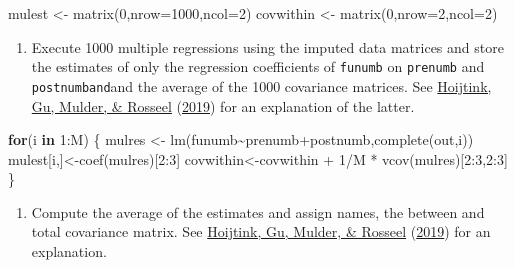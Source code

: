 \documentclass[
]{book}
\newenvironment{Shaded}{\begin{snugshade}}{\end{snugshade}}
\newcommand{\AttributeTok}[1]{\textcolor[rgb]{0.77,0.63,0.00}{#1}}
\newcommand{\ControlFlowTok}[1]{\textcolor[rgb]{0.13,0.29,0.53}{\textbf{#1}}}
\newcommand{\DecValTok}[1]{\textcolor[rgb]{0.00,0.00,0.81}{#1}}
\newcommand{\FunctionTok}[1]{\textcolor[rgb]{0.00,0.00,0.00}{#1}}
\newcommand{\NormalTok}[1]{#1}
\newcommand{\OtherTok}[1]{\textcolor[rgb]{0.56,0.35,0.01}{#1}}
\newcommand{\SpecialCharTok}[1]{\textcolor[rgb]{0.00,0.00,0.00}{#1}}
\providecommand{\tightlist}{%
  \setlength{\itemsep}{0pt}\setlength{\parskip}{0pt}}
\begin{document}
\begin{Shaded}
\begin{Highlighting}[]
\NormalTok{mulest }\OtherTok{\textless{}{-}} \FunctionTok{matrix}\NormalTok{(}\DecValTok{0}\NormalTok{,}\AttributeTok{nrow=}\DecValTok{1000}\NormalTok{,}\AttributeTok{ncol=}\DecValTok{2}\NormalTok{)}
\NormalTok{covwithin }\OtherTok{\textless{}{-}} \FunctionTok{matrix}\NormalTok{(}\DecValTok{0}\NormalTok{,}\AttributeTok{nrow=}\DecValTok{2}\NormalTok{,}\AttributeTok{ncol=}\DecValTok{2}\NormalTok{)}
\end{Highlighting}
\end{Shaded}

\begin{enumerate}
\def\labelenumi{\arabic{enumi})}
\setcounter{enumi}{2}
\tightlist
\item
  Execute 1000 multiple regressions using the imputed data matrices and store the estimates of only the regression coefficients of \texttt{funumb} on \texttt{prenumb} and \texttt{postnumband}and the average of the 1000 covariance matrices. See \protect\hyperlink{ref-hoijtink2019computing}{Hoijtink, Gu, Mulder, \& Rosseel} (\protect\hyperlink{ref-hoijtink2019computing}{2019}) for an explanation of the latter.
\end{enumerate}

\begin{Shaded}
\begin{Highlighting}[]
\ControlFlowTok{for}\NormalTok{(i }\ControlFlowTok{in} \DecValTok{1}\SpecialCharTok{:}\NormalTok{M) \{}
\NormalTok{  mulres }\OtherTok{\textless{}{-}} \FunctionTok{lm}\NormalTok{(funumb}\SpecialCharTok{\textasciitilde{}}\NormalTok{prenumb}\SpecialCharTok{+}\NormalTok{postnumb,}\FunctionTok{complete}\NormalTok{(out,i))}
\NormalTok{  mulest[i,]}\OtherTok{\textless{}{-}}\FunctionTok{coef}\NormalTok{(mulres)[}\DecValTok{2}\SpecialCharTok{:}\DecValTok{3}\NormalTok{]}
\NormalTok{  covwithin}\OtherTok{\textless{}{-}}\NormalTok{covwithin }\SpecialCharTok{+} \DecValTok{1}\SpecialCharTok{/}\NormalTok{M }\SpecialCharTok{*} \FunctionTok{vcov}\NormalTok{(mulres)[}\DecValTok{2}\SpecialCharTok{:}\DecValTok{3}\NormalTok{,}\DecValTok{2}\SpecialCharTok{:}\DecValTok{3}\NormalTok{]}
\NormalTok{\}}
\end{Highlighting}
\end{Shaded}

\begin{enumerate}
\def\labelenumi{\arabic{enumi})}
\setcounter{enumi}{3}
\tightlist
\item
  Compute the average of the estimates and assign names, the between and total covariance matrix. See \protect\hyperlink{ref-hoijtink2019computing}{Hoijtink, Gu, Mulder, \& Rosseel} (\protect\hyperlink{ref-hoijtink2019computing}{2019}) for an explanation.
\end{enumerate}
\end{document}
